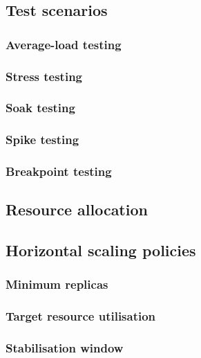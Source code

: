 \subsection{Test scenarios}
\subsubsection{Average-load testing}
\subsubsection{Stress testing}
\subsubsection{Soak testing}
\subsubsection{Spike testing}
\subsubsection{Breakpoint testing}
\subsection{Resource allocation}
\subsection{Horizontal scaling policies}
\subsubsection{Minimum replicas}
\subsubsection{Target resource utilisation}
\subsubsection{Stabilisation window}